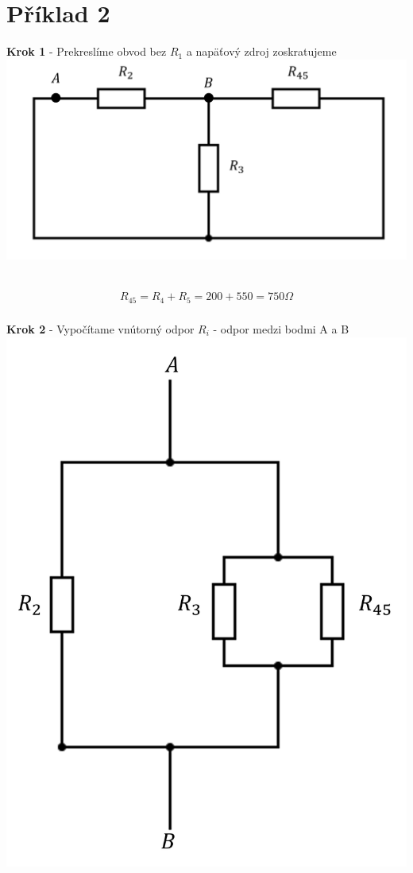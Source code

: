 \section{Příklad 2}

\begin{center}
    \textbf{Krok 1} - Prekreslíme obvod bez $R_{1}$ a  napäťový zdroj zoskratujeme
    \includegraphics[scale=0.5,keepaspectratio]{fig/pr2_1.png} \
\end{center}

\begin{gather*}
    R_{45} = R_4 + R_5 = 200 + 550 = 750 \Omega \\
\end{gather*}

\begin{center}
    \textbf{Krok 2} - Vypočítame vnútorný odpor $R_{i}$  - odpor medzi bodmi A a B
    \includegraphics[scale=0.5,keepaspectratio]{fig/pr2_2.png} \
\end{center}

